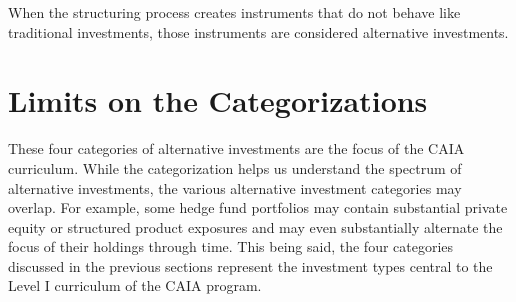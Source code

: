 \documentclass[11pt]{article}
\begin{document}
When the structuring process creates instruments that do not behave like traditional investments, those instruments are considered alternative investments.

\section*{Limits on the Categorizations}
These four categories of alternative investments are the focus of the CAIA curriculum. While the categorization helps us understand the spectrum of alternative investments, the various alternative investment categories may overlap. For example, some hedge fund portfolios may contain substantial private equity or structured product exposures and may even substantially alternate the focus of their holdings through time. This being said, the four categories discussed in the previous sections represent the investment types central to the Level I curriculum of the CAIA program.
\end{document}
